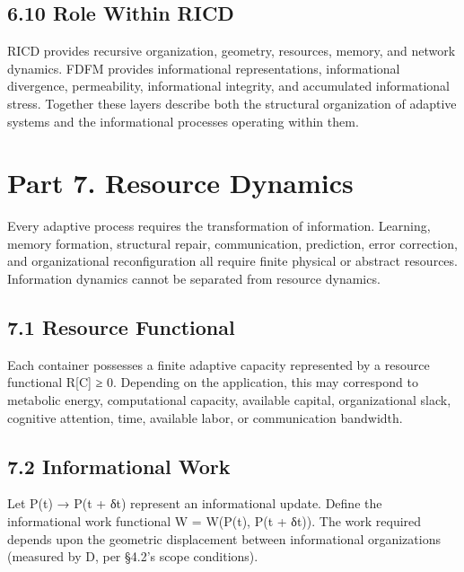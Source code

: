 \documentclass[
]{article}
\begin{document}
\hypertarget{role-within-ricd}{%
\subsection{6.10 Role Within RICD}\label{role-within-ricd}}

RICD provides recursive organization, geometry, resources, memory, and
network dynamics. FDFM provides informational representations,
informational divergence, permeability, informational integrity, and
accumulated informational stress. Together these layers describe both
the structural organization of adaptive systems and the informational
processes operating within them.

\hypertarget{part-7.-resource-dynamics}{%
\section{Part 7. Resource Dynamics}\label{part-7.-resource-dynamics}}

Every adaptive process requires the transformation of information.
Learning, memory formation, structural repair, communication,
prediction, error correction, and organizational reconfiguration all
require finite physical or abstract resources. Information dynamics
cannot be separated from resource dynamics.

\hypertarget{resource-functional}{%
\subsection{7.1 Resource Functional}\label{resource-functional}}

Each container possesses a finite adaptive capacity represented by a
resource functional R{[}C{]} ≥ 0. Depending on the application, this may
correspond to metabolic energy, computational capacity, available
capital, organizational slack, cognitive attention, time, available
labor, or communication bandwidth.

\hypertarget{informational-work}{%
\subsection{7.2 Informational Work}\label{informational-work}}

Let P(t) → P(t + δt) represent an informational update. Define the
informational work functional W = W(P(t), P(t + δt)). The work required
depends upon the geometric displacement between informational
organizations (measured by D, per §4.2's scope conditions).
\end{document}
